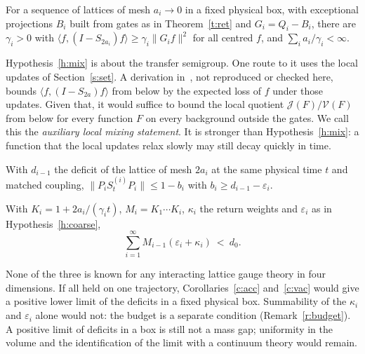 \begin{hypothesis}\label{h:mix}
For a sequence of lattices of mesh $a_i\to0$ in a fixed physical box, with exceptional projections $B_i$ built
from gates as in Theorem~\ref{t:ret} and $G_i=Q_i-B_i$, there are $\gamma_i>0$ with
$\langle f,(I-S_{2a_i})f\rangle\ge\gamma_i\|G_if\|^2$ for all centred $f$, and $\sum_ia_i/\gamma_i<\infty$.
\end{hypothesis}

Hypothesis~\ref{h:mix} is about the transfer semigroup. One route to it uses the local updates of
Section~\ref{s:set}. A derivation in~\cite{RepoInh}, not reproduced or checked here, bounds
$\langle f,(I-S_{2a})f\rangle$ from below by the expected loss of $f$ under those updates. Given that, it would
suffice to bound the local quotient $\mathcal J(F)/\mathcal V(F)$ from below for every function $F$ on every
background outside the gates. We call this the \emph{auxiliary local mixing statement}. It is stronger than
Hypothesis~\ref{h:mix}: a function that the local updates relax slowly may still decay quickly in time.

\begin{hypothesis}\label{h:coarse}
With $d_{i-1}$ the deficit of the lattice of mesh $2a_i$ at the same physical time $t$ and matched coupling,
$\|P_iS^{(i)}_tP_i\|\le1-b_i$ with $b_i\ge d_{i-1}-\varepsilon_i$.
\end{hypothesis}

\begin{hypothesis}\label{h:budget}
With $K_i=1+2a_i/(\gamma_it)$, $M_i=K_1\cdots K_i$, $\kappa_i$ the return weights and $\varepsilon_i$ as in
Hypothesis~\ref{h:coarse},
\[
\sum_{i=1}^\infty M_{i-1}(\varepsilon_i+\kappa_i)\ <\ d_0 .
\]
\end{hypothesis}

None of the three is known for any interacting lattice gauge theory in four dimensions. If all held on one
trajectory, Corollaries~\ref{c:acc} and~\ref{c:vac} would give a positive lower limit of the deficits in a
fixed physical box. Summability of the $\kappa_i$ and $\varepsilon_i$ alone would not: the budget is a
separate condition (Remark~\ref{r:budget}). A positive limit of deficits in a box is still not a mass gap;
uniformity in the volume and the identification of the limit with a continuum theory would remain.

